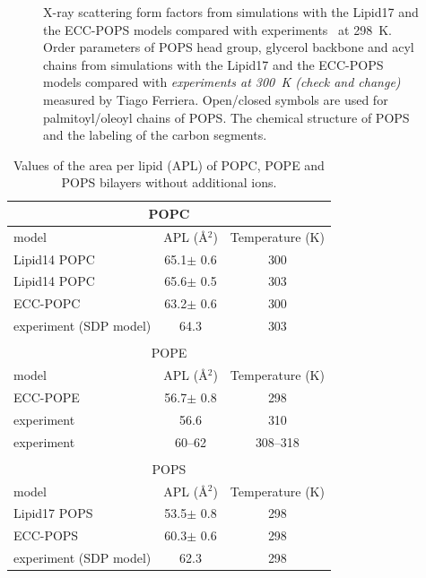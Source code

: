 \begin{figure}[tb!]
  \caption{\label{simVSexpNOions_POPS} 
    X-ray scattering form factors from simulations with the Lipid17 \cite{lipid17-future} and 
    the ECC-POPS \citep{melcr18} models compared with experiments~\cite{SDP-CHARMM36_comparison_paper_Samuli-knows} at 298~K. 
    Order parameters of POPS head group, glycerol backbone and acyl chains  
    from simulations with the Lipid17 \cite{lipid17-future} and the ECC-POPS models 
    compared with \emph{experiments at 300~K (check and change)} measured by Tiago Ferriera. 
    Open/closed symbols are used for palmitoyl/oleoyl chains of POPS. 
    The chemical structure of POPS and the labeling of the carbon segments. 
  }  
\end{figure} 
 
\begin{table}[tb!] 
  \caption{Values of the area per lipid (APL) of POPC, POPE and POPS bilayers without additional ions. \label{tab:apls} 
  } 
  \begin{tabular}{l|c c} 
    \multicolumn{3}{c}{POPC} \\
    \hline 
    model          & APL (Å$^2$)   & Temperature (K) \\ 
    \hline 
    Lipid14 POPC                    & 65.1$\pm$ 0.6  &  300 \\ 
    Lipid14 POPC \citep{dickson14}  & 65.6$\pm$ 0.5  &  303 \\ 
    \hline 
    ECC-POPC     \citep{melcr18}    & 63.2$\pm$ 0.6  &  300       \\ 
    \hline 
    experiment (SDP model) \citep{kucerka11} & 64.3  &  303    \\ 
    \hline 
    \\
    \multicolumn{3}{c}{POPE} \\
    \hline 
    model          & APL (Å$^2$)   & Temperature (K) \\ 
    \hline 
    ECC-POPE                 & 56.7$\pm$ 0.8  &  298 \\ 
    \hline 
    experiment   \citep{parsegian89} & 56.6  &  310    \\ 
    experiment   \citep{rappolt03}   & 60--62 &  308--318  \\ 
    \hline 
    \\
    \multicolumn{3}{c}{POPS} \\
    \hline 
    model          & APL (Å$^2$)   & Temperature (K) \\ 
    \hline 
    Lipid17 POPS              & 53.5$\pm$ 0.8  &  298 \\ 
    \hline 
    ECC-POPS                & 60.3$\pm$ 0.6  &  298       \\ 
    \hline 
    experiment (SDP model) \cite{SDP-CHARMM36_comparison_paper_Samuli-knows} & 62.3  &  298    \\ 
    \hline 
  \end{tabular} 
\end{table} 
 
